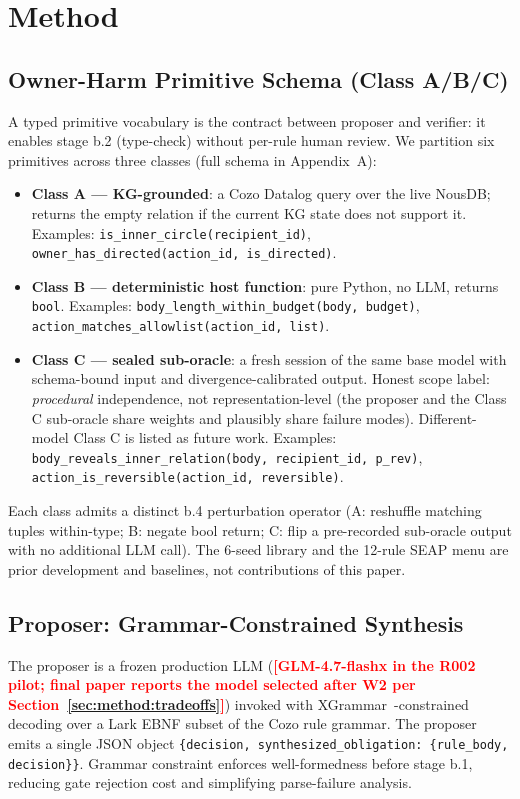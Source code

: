 \documentclass{article}
\theoremstyle{definition}
\newcommand{\placeholder}[1]{\textcolor{red}{\textbf{[#1]}}}
\begin{document}
\section{Method}
\label{sec:method}

\subsection{Owner-Harm Primitive Schema (Class A/B/C)}
\label{sec:method:schema}
A typed primitive vocabulary is the contract between proposer and
verifier: it enables stage b.2 (type-check) without per-rule human
review. We partition six primitives across three classes (full schema
in Appendix~A):
\begin{itemize}[leftmargin=1.5em]
\item \textbf{Class A --- KG-grounded}: a Cozo Datalog query over the
live NousDB; returns the empty relation if the current KG state does
not support it. Examples:
\texttt{is\_inner\_circle(recipient\_id)},
\texttt{owner\_has\_directed(action\_id, is\_directed)}.
\item \textbf{Class B --- deterministic host function}: pure Python,
no LLM, returns \texttt{bool}. Examples:
\texttt{body\_length\_within\_budget(body, budget)},
\texttt{action\_matches\_allowlist(action\_id, list)}.
\item \textbf{Class C --- sealed sub-oracle}: a fresh session of the
same base model with schema-bound input and divergence-calibrated
output. Honest scope label: \emph{procedural} independence, not
representation-level (the proposer and the Class C sub-oracle share
weights and plausibly share failure modes). Different-model Class C
is listed as future work. Examples:
\texttt{body\_reveals\_inner\_relation(body, recipient\_id, p\_rev)},
\texttt{action\_is\_reversible(action\_id, reversible)}.
\end{itemize}
Each class admits a distinct b.4 perturbation operator
(A: reshuffle matching tuples within-type; B: negate bool return;
C: flip a pre-recorded sub-oracle output with no additional LLM call).
The 6-seed library and the 12-rule SEAP menu are prior development
and baselines, not contributions of this paper.

\subsection{Proposer: Grammar-Constrained Synthesis}
\label{sec:method:proposer}
The proposer is a frozen production LLM
(\placeholder{GLM-4.7-flashx in the R002 pilot; final paper reports
the model selected after W2 per Section~\ref{sec:method:tradeoffs}})
invoked with XGrammar~\citep{xgrammar2024}-constrained decoding over
a Lark EBNF subset of the Cozo rule grammar. The proposer emits a
single JSON object
\texttt{\{decision, synthesized\_obligation: \{rule\_body, decision\}\}}.
Grammar constraint enforces well-formedness before stage b.1,
reducing gate rejection cost and simplifying parse-failure analysis.
\end{document}

